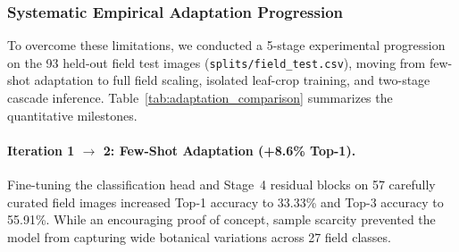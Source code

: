 \subsubsection{Systematic Empirical Adaptation Progression}
To overcome these limitations, we conducted a 5-stage experimental progression on the 93 held-out field test images (\texttt{splits/field\_test.csv}), moving from few-shot adaptation to full field scaling, isolated leaf-crop training, and two-stage cascade inference. Table~\ref{tab:adaptation_comparison} summarizes the quantitative milestones.

\begin{table}[htbp]
\centering
\caption{\textbf{Empirical Domain Adaptation \& Field Robustness Progression on Held-Out Field Test Set} (93 In-The-Wild Images, \texttt{splits/field\_test.csv}).}
\label{tab:adaptation_comparison}
\end{table}

\paragraph{Iteration 1 $\rightarrow$ 2: Few-Shot Adaptation (+8.6\% Top-1).} Fine-tuning the classification head and Stage~4 residual blocks on 57 carefully curated field images increased Top-1 accuracy to 33.33\% and Top-3 accuracy to 55.91\%. While an encouraging proof of concept, sample scarcity prevented the model from capturing wide botanical variations across 27 field classes.

